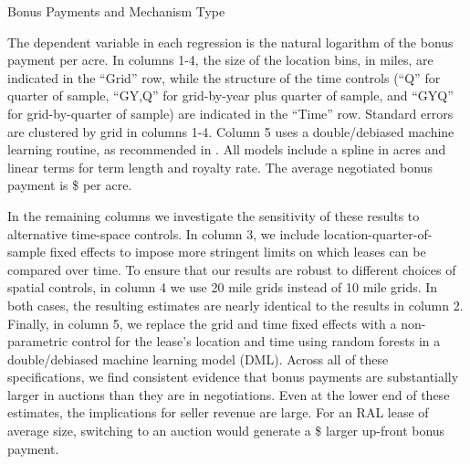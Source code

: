 \documentclass[12pt]{article}
\newcommand{\inputy}[1]{\unskip}
\begin{document}
\addtolength{\tabcolsep}{6pt}
\begin{table}[!htbp]
	\begin{center}
	\begin{threeparttable}
	\caption{Bonus Payments and Mechanism Type}
	\label{tab:table_main_bonus}
	\small
	            
	\footnotesize
		\begin{tablenotes}
			\item The dependent variable in each regression is the natural logarithm of the bonus payment per acre. In columns 1-4, the size of the location bins, in miles, are indicated in the ``Grid'' row, while the structure of the time controls (``Q'' for quarter of sample, ``GY,Q'' for grid-by-year plus quarter of sample, and ``GYQ'' for grid-by-quarter of sample) are indicated in the ``Time'' row.  Standard errors are clustered by grid in columns 1-4.  Column 5 uses a double/debiased machine learning routine, as recommended in \cite{chernozhukov2018double}.  All models include a spline in acres and linear terms for term length and royalty rate.  The average negotiated bonus payment is \$\inputy{../output/estimates/negotiation_avg_bonus.tex} per acre.    
		\end{tablenotes}
	\end{threeparttable}
	\end{center}
\end{table}

In the remaining columns we investigate the sensitivity of these results to alternative time-space controls. In column 3, we include location-quarter-of-sample fixed effects to impose more stringent limits on which leases can be compared over time.  To ensure that our results are robust to different choices of spatial controls, in column 4 we use 20 mile grids instead of 10 mile grids.  In both cases, the resulting estimates are nearly identical to the results in column 2.  Finally, in column 5, we replace the grid and time fixed effects with a non-parametric control for the lease's location and time using random forests in a double/debiased machine learning model (DML). Across all of these specifications, we find consistent evidence that bonus payments are substantially larger in auctions than they are in negotiations. Even at the lower end of these estimates, the implications for seller revenue are large.  For an RAL lease of average size, switching to an auction would generate a \$\inputy{../output/estimates/Bonus_Grid10Yr_log_total.tex} larger up-front bonus payment. 
\end{document}
